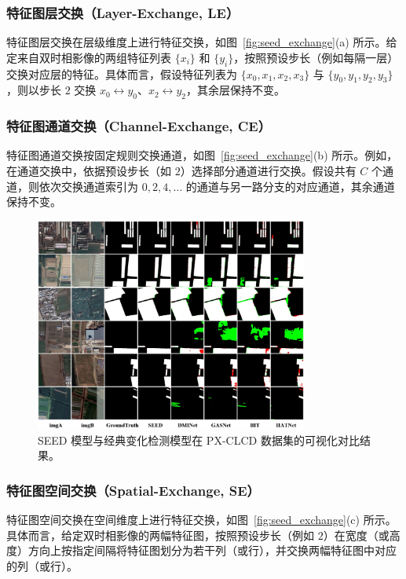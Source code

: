 \subsubsection{特征图层交换（Layer-Exchange, LE）}
特征图层交换在层级维度上进行特征交换，如图~\ref{fig:seed_exchange}(a) 所示。给定来自双时相影像的两组特征列表 \(\{x_i\}\) 和 \(\{y_i\}\)，按照预设步长（例如每隔一层）交换对应层的特征。具体而言，假设特征列表为 \(\{x_0, x_1, x_2, x_3\}\) 与 \(\{y_0, y_1, y_2, y_3\}\)，则以步长 \(2\) 交换 \(x_0 \leftrightarrow y_0\)、\(x_2 \leftrightarrow y_2\)，其余层保持不变。

\subsubsection{特征图通道交换（Channel-Exchange, CE）} 
特征图通道交换按固定规则交换通道，如图~\ref{fig:seed_exchange}(b) 所示。例如，在通道交换中，依据预设步长（如 $2$）选择部分通道进行交换。假设共有 $C$ 个通道，则依次交换通道索引为 $0,2,4,\ldots$ 的通道与另一路分支的对应通道，其余通道保持不变。


\begin{figure}[!htb]
  \centering
  \includegraphics[width=0.8\textwidth]{paper_figures/变化检测任务基础范式设计/seed_pxclcd.png}
  \caption{SEED 模型与经典变化检测模型在 PX-CLCD 数据集的可视化对比结果。}
  \label{fig:seed_pxclcd}
\end{figure}

\subsubsection{特征图空间交换（Spatial-Exchange, SE）}
特征图空间交换在空间维度上进行特征交换，如图~\ref{fig:seed_exchange}(c) 所示。具体而言，给定双时相影像的两幅特征图，按照预设步长（例如 $2$）在宽度（或高度）方向上按指定间隔将特征图划分为若干列（或行），并交换两幅特征图中对应的列（或行）。


